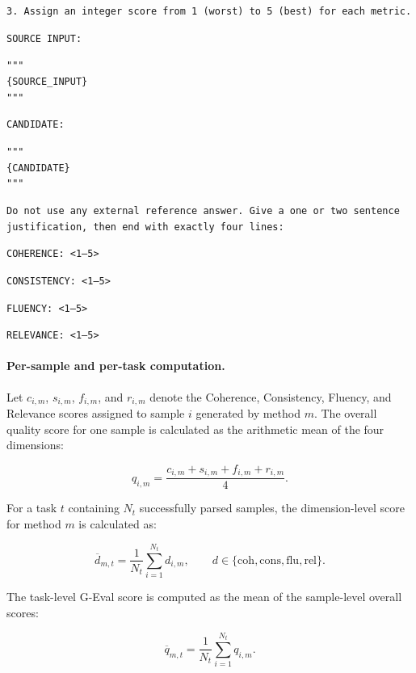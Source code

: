 \documentclass{article} %
\begin{document}
\begin{tcolorbox}[
    colback=gray!5,
    colframe=black!45,
    title=Reference-free G-Eval prompt,
    breakable,
    left=3pt,
    right=3pt,
    top=3pt,
    bottom=3pt
]
\texttt{3. Assign an integer score from 1 (worst) to 5 (best) for each metric.}

\medskip

\texttt{SOURCE INPUT:}

\texttt{"""}\\
\texttt{\{SOURCE\_INPUT\}}\\
\texttt{"""}

\medskip

\texttt{CANDIDATE:}

\texttt{"""}\\
\texttt{\{CANDIDATE\}}\\
\texttt{"""}

\medskip

\texttt{Do not use any external reference answer. Give a one or two sentence justification, then end with exactly four lines:}

\texttt{COHERENCE: <1--5>}

\texttt{CONSISTENCY: <1--5>}

\texttt{FLUENCY: <1--5>}

\texttt{RELEVANCE: <1--5>}
\end{tcolorbox}

\paragraph{Per-sample and per-task computation.}
Let $c_{i,m}$, $s_{i,m}$, $f_{i,m}$, and $r_{i,m}$ denote the Coherence, Consistency, Fluency, and Relevance scores assigned to sample $i$ generated by method $m$. The overall quality score for one sample is calculated as the arithmetic mean of the four dimensions:

\begin{equation}
q_{i,m}
=
\frac{
c_{i,m}+s_{i,m}+f_{i,m}+r_{i,m}
}{4}.
\end{equation}

For a task $t$ containing $N_t$ successfully parsed samples, the dimension-level score for method $m$ is calculated as:

\begin{equation}
\overline{d}_{m,t}
=
\frac{1}{N_t}
\sum_{i=1}^{N_t} d_{i,m},
\qquad
d \in \{\mathrm{coh},\mathrm{cons},\mathrm{flu},\mathrm{rel}\}.
\end{equation}

The task-level G-Eval score is computed as the mean of the sample-level overall scores:

\begin{equation}
\overline{q}_{m,t}
=
\frac{1}{N_t}
\sum_{i=1}^{N_t} q_{i,m}.
\end{equation}
\end{document}
